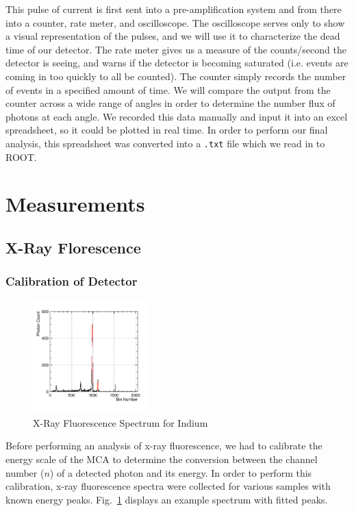 \documentclass[%
 reprint,
 amsmath,amssymb,
 aps,
 pra,
]{revtex4-1}
\begin{document}
This pulse of current is first sent into a pre-amplification system and from there into a counter, rate meter, and oscilloscope. The oscilloscope serves only to show a visual representation of the pulses, and we will use it to characterize the dead time of our detector. The rate meter gives us a measure of the counts/second the detector is seeing, and warns if the detector is becoming saturated (i.e. events are coming in too quickly to all be counted). The counter simply records the number of events in a specified amount of time. We will compare the output from the counter across a wide range of angles in order to determine the number flux of photons at each angle. We recorded this data manually and input it into an excel spreadsheet, so it could be plotted in real time. In order to perform our final analysis, this spreadsheet was converted into a \verb|.txt| file which we read in to ROOT.

\section{Measurements}

\subsection{X-Ray Florescence}

\subsubsection{Calibration of Detector}

\begin{figure}[H]
	\centering
	\includegraphics[width=0.4\textwidth]{InBinnedSpectrum.png}
	\caption{X-Ray Fluorescence Spectrum for Indium}
	\label{Fig:InXRFSpec}
\end{figure}

Before performing an analysis of x-ray fluorescence, we had to calibrate the energy scale of the MCA to determine the conversion between the channel number ($n$) of a detected photon and its energy. In order to perform this calibration, x-ray fluorescence spectra were collected for various samples with known energy peaks. Fig.~\ref{Fig:InXRFSpec} displays an example spectrum with fitted peaks.
\end{document}

